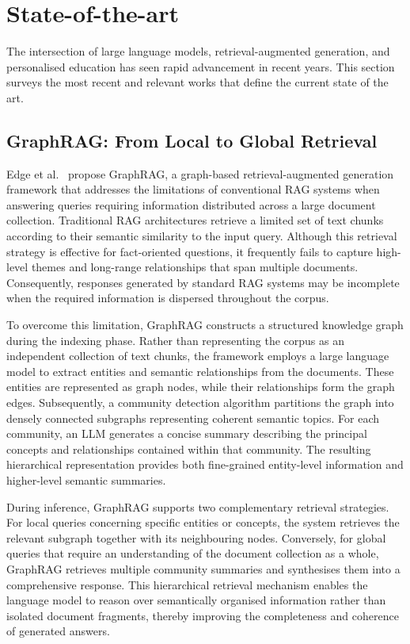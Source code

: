 \section{State-of-the-art}
\label{sec:state-of-the-art}
The intersection of large language models, retrieval-augmented generation, and personalised education has seen rapid advancement in recent years. This section surveys the most recent and relevant works that define the current state of the art.


\subsection{GraphRAG: From Local to Global Retrieval}

Edge et al.~\cite{edge2024localglobalgraphrag} propose GraphRAG, a graph-based retrieval-augmented generation framework that addresses the limitations of conventional RAG systems when answering queries requiring information distributed across a large document collection. Traditional RAG architectures retrieve a limited set of text chunks according to their semantic similarity to the input query. Although this retrieval strategy is effective for fact-oriented questions, it frequently fails to capture high-level themes and long-range relationships that span multiple documents. Consequently, responses generated by standard RAG systems may be incomplete when the required information is dispersed throughout the corpus.

To overcome this limitation, GraphRAG constructs a structured knowledge graph during the indexing phase. Rather than representing the corpus as an independent collection of text chunks, the framework employs a large language model to extract entities and semantic relationships from the documents. These entities are represented as graph nodes, while their relationships form the graph edges. Subsequently, a community detection algorithm partitions the graph into densely connected subgraphs representing coherent semantic topics. For each community, an LLM generates a concise summary describing the principal concepts and relationships contained within that community. The resulting hierarchical representation provides both fine-grained entity-level information and higher-level semantic summaries.

During inference, GraphRAG supports two complementary retrieval strategies. For local queries concerning specific entities or concepts, the system retrieves the relevant subgraph together with its neighbouring nodes. Conversely, for global queries that require an understanding of the document collection as a whole, GraphRAG retrieves multiple community summaries and synthesises them into a comprehensive response. This hierarchical retrieval mechanism enables the language model to reason over semantically organised information rather than isolated document fragments, thereby improving the completeness and coherence of generated answers.

